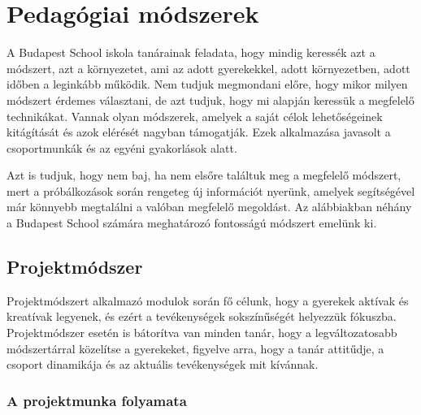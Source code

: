\section{Pedagógiai módszerek}
\label{sec:pedagogia_modszerek}

A Budapest School iskola tanárainak feladata, hogy mindig keressék azt a módszert, azt a környezetet, ami az adott gyerekekkel, adott környezetben, adott időben a leginkább működik. Nem tudjuk megmondani előre, hogy mikor milyen módszert érdemes választani, de azt tudjuk, hogy mi alapján keressük a megfelelő technikákat. Vannak olyan módszerek, amelyek a saját célok lehetőségeinek kitágítását és azok elérését nagyban támogatják. Ezek alkalmazása javasolt a csoportmunkák és az egyéni gyakorlások alatt.

Azt is tudjuk, hogy nem baj, ha nem elsőre találtuk meg a megfelelő módszert, mert a próbálkozások során rengeteg új információt nyerünk, amelyek segítségével már könnyebb megtalálni a valóban megfelelő megoldást. Az alábbiakban néhány a Budapest School számára meghatározó fontosságú módszert emelünk ki.

\subsection{Projektmódszer}
Projektmódszert alkalmazó modulok során fő célunk, hogy a gyerekek aktívak és kreatívak legyenek, és ezért a tevékenységek sokszínűségét helyezzük fókuszba. Projektmódszer esetén is bátorítva van minden tanár, hogy a legváltozatosabb módszertárral közelítse a gyerekeket, figyelve arra, hogy a tanár attitűdje, a csoport dinamikája és az aktuális tevékenységek mit kívánnak.

\subsubsection{A projektmunka folyamata}

